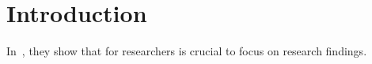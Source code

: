 
\section{Introduction \label{sec:introduction}}
	In~\cite{ACleverResearcher2023}, they show that for researchers is crucial to focus on research findings.
	
